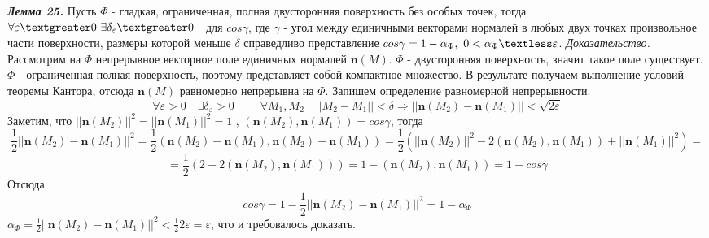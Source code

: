 \documentclass[12pt,a4paper]{article}
\begin{document}
	\newline
	\newline
	\textit{\textbf{Лемма 25.}} Пусть $\Phi$ - гладкая, ограниченная, полная двусторонняя поверхность без особых точек, тогда 
	$\forall \varepsilon \textgreater 0 \ \exists \delta_{\varepsilon} \textgreater 0 \ | $ для $cos\gamma$, где $\gamma$ - угол между единичными векторами нормалей в любых двух точках произвольное части поверхности, размеры которой меньше $\delta$ справедливо представление $cos\gamma = 1 - \alpha_{\Phi}, \ 0 < \alpha_{\Phi} \textless \varepsilon$.
	\newline
	\newline	
	\textit{Доказательство.}
	\newline
	Рассмотрим на $\Phi$ непрерывное векторное поле единичных нормалей $\textbf{n}(M)$. $\Phi$ - двусторонняя поверхность, значит такое поле существует. $\Phi$ - ограниченная полная поверхность, поэтому представляет собой компактное множество. В результате получаем выполнение условий теоремы Кантора, отсюда $\textbf{n}(M)$ равномерно непрерывна на $\Phi$. Запишем определение равномерной непрерывности.
	\[ \forall \varepsilon  > 0 \quad \exists \delta_{\varepsilon} > 0 \quad | \quad \forall M_{1}, M_{2} \quad ||M_{2} - M_{1} || < \delta \Rightarrow ||\textbf{n}(M_{2}) - \textbf{n}(M_{1})|| < \sqrt{2\varepsilon} \]
	Заметим, что $||\textbf{n}(M_{2})||^2 = ||\textbf{n}(M_{1})||^2 = 1$ , $(\textbf{n}(M_{2}) , \textbf{n}(M_{1})) = cos\gamma$, тогда
	\newline
	\[\frac{1}{2}||\textbf{n}(M_{2}) - \textbf{n}(M_{1})||^2 = \frac{1}{2}(\textbf{n}(M_{2}) - \textbf{n}(M_{1}), \textbf{n}(M_{2}) - \textbf{n}(M_{1})) = \frac{1}{2}(||\textbf{n}(M_{2})||^2 - 2(\textbf{n}(M_{2}) , \textbf{n}(M_{1})) + ||\textbf{n}(M_{1})||^2) = \]
	\[ = \frac{1}{2}(2 - 2(\textbf{n}(M_{2}) , \textbf{n}(M_{1}))) = 1 - (\textbf{n}(M_{2}) , \textbf{n}(M_{1})) = 1 - cos\gamma\]
	Отсюда
	\[ cos\gamma = 1 - \frac{1}{2}||\textbf{n}(M_{2}) - \textbf{n}(M_{1})||^2 = 1 - \alpha_{\Phi}\]
	$\alpha_{\Phi} = \frac{1}{2}||\textbf{n}(M_{2}) - \textbf{n}(M_{1})||^2 < \frac{1}{2}2\varepsilon = \varepsilon$, что и требовалось доказать.
	
	\newpage
\end{document}

